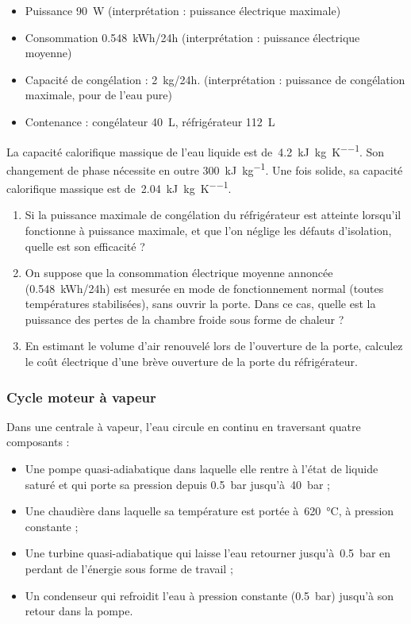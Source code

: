 	\begin{itemize}
		\item Puissance \SI{90}{\watt}	(interprétation : puissance électrique maximale)
		\item Consommation \SI{0,548}{kWh/24h}	(interprétation : puissance électrique moyenne)
		\item Capacité de congélation : \SI{2}{kg/24h}.	(interprétation : puissance de congélation maximale, pour de l’eau pure)
		\item Contenance : congélateur \SI{40}{\liter}, réfrigérateur \SI{112}{\liter}
	\end{itemize}
	
	La capacité calorifique massique de l’eau liquide est de~\SI{4,2}{\kilo\joule\per\kilogram\per\kelvin}. Son changement de phase nécessite en outre \SI{300}{\kilo\joule\per\kilogram}. Une fois solide, sa capacité calorifique massique est de~\SI{2,04}{\kilo\joule\per\kilogram\per\kelvin}. 
	
	\begin{enumerate}
		\item Si la puissance maximale de congélation du réfrigérateur est atteinte lorsqu’il fonctionne à puissance maximale, et que l’on néglige les défauts d’isolation, quelle est son efficacité ?
		\item On suppose que la consommation électrique moyenne annoncée (\SI{0,548}{kWh/24h}) est mesurée en mode de fonctionnement normal (toutes températures stabilisées), sans ouvrir la porte. Dans ce cas, quelle est la puissance des pertes de la chambre froide sous forme de chaleur ?
		\item En estimant le volume d’air renouvelé lors de l’ouverture de la porte, calculez le coût électrique d’une brève ouverture de la porte du réfrigérateur.
	\end{enumerate}


\subsubsection{Cycle moteur à vapeur}

	Dans une centrale à vapeur, l’eau circule en continu en traversant quatre composants :
	
	\begin{itemize}
		\item Une pompe quasi-adiabatique dans laquelle elle rentre à l’état de liquide saturé et qui porte sa pression depuis \SI{0,5}{\bar} jusqu’à~\SI{40}{\bar} ;
		\item Une chaudière dans laquelle sa température est portée à~\SI{620}{\degreeCelsius}, à pression constante ;
		\item Une turbine quasi-adiabatique qui laisse l’eau retourner jusqu’à~\SI{0,5}{\bar} en perdant de l’énergie sous forme de travail ;
		\item Un condenseur qui refroidit l’eau à pression constante (\SI{0,5}{\bar}) jusqu’à son retour dans la pompe.
	\end{itemize}
	
